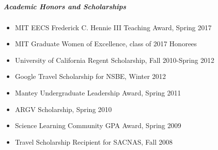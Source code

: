 \documentclass[10pt,letterpaper]{article}
\begin{document}
\begin{spacing}{.7}
\subparagraph{Academic Honors and Scholarships}
\begin{itemize}
\item MIT EECS Frederick C. Hennie III Teaching Award, Spring 2017
\item MIT Graduate Women of Excellence, class of 2017 Honorees
\item University of California Regent Scholarship, Fall 2010-Spring 2012 
\item  Google Travel Scholarship for NSBE,  Winter 2012 
\item Mantey Undergraduate Leadership Award,  Spring 2011 
 \item ARGV Scholarship, Spring 2010 
\item  Science Learning Community GPA Award, Spring 2009 
\item Travel Scholarship Recipient for SACNAS, Fall 2008 
\end{itemize}
\end{spacing}
\end{document}
